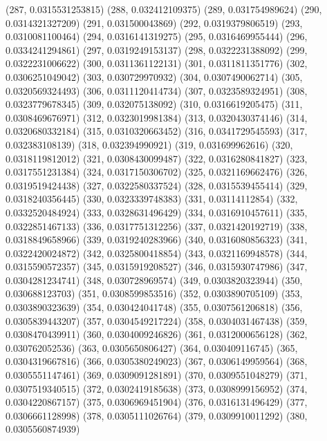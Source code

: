 {					(287, 0.0315531253815)
					(288, 0.032412109375)
					(289, 0.031754989624)
					(290, 0.0314321327209)
					(291, 0.031500043869)
					(292, 0.0319379806519)
					(293, 0.0310081100464)
					(294, 0.0316141319275)
					(295, 0.0316469955444)
					(296, 0.0334241294861)
					(297, 0.0319249153137)
					(298, 0.0322231388092)
					(299, 0.0322231006622)
					(300, 0.0311361122131)
					(301, 0.0311811351776)
					(302, 0.0306251049042)
					(303, 0.030729970932)
					(304, 0.0307490062714)
					(305, 0.0320569324493)
					(306, 0.0311120414734)
					(307, 0.0323589324951)
					(308, 0.0323779678345)
					(309, 0.032075138092)
					(310, 0.0316619205475)
					(311, 0.0308469676971)
					(312, 0.0323019981384)
					(313, 0.0320430374146)
					(314, 0.0320680332184)
					(315, 0.0310320663452)
					(316, 0.0341729545593)
					(317, 0.032383108139)
					(318, 0.032394990921)
					(319, 0.031699962616)
					(320, 0.0318119812012)
					(321, 0.0308430099487)
					(322, 0.0316280841827)
					(323, 0.0317551231384)
					(324, 0.0317150306702)
					(325, 0.0321169662476)
					(326, 0.0319519424438)
					(327, 0.0322580337524)
					(328, 0.0315539455414)
					(329, 0.0318240356445)
					(330, 0.0323339748383)
					(331, 0.03114112854)
					(332, 0.0332520484924)
					(333, 0.0328631496429)
					(334, 0.0316910457611)
					(335, 0.0322851467133)
					(336, 0.0317751312256)
					(337, 0.0321420192719)
					(338, 0.0318849658966)
					(339, 0.0319240283966)
					(340, 0.0316080856323)
					(341, 0.0322420024872)
					(342, 0.0325800418854)
					(343, 0.0321169948578)
					(344, 0.0315590572357)
					(345, 0.0315919208527)
					(346, 0.0315930747986)
					(347, 0.0304281234741)
					(348, 0.030728969574)
					(349, 0.0303820323944)
					(350, 0.030688123703)
					(351, 0.0308599853516)
					(352, 0.0303890705109)
					(353, 0.0303890323639)
					(354, 0.030424041748)
					(355, 0.0307561206818)
					(356, 0.0305839443207)
					(357, 0.0304549217224)
					(358, 0.0304031467438)
					(359, 0.0308470439911)
					(360, 0.0304009246826)
					(361, 0.0312000656128)
					(362, 0.030762052536)
					(363, 0.0305650806427)
					(364, 0.030409116745)
					(365, 0.0304319667816)
					(366, 0.0305380249023)
					(367, 0.0306149959564)
					(368, 0.0305551147461)
					(369, 0.0309091281891)
					(370, 0.0309551048279)
					(371, 0.0307519340515)
					(372, 0.0302419185638)
					(373, 0.0308999156952)
					(374, 0.0304220867157)
					(375, 0.0306969451904)
					(376, 0.0316131496429)
					(377, 0.0306661128998)
					(378, 0.0305111026764)
					(379, 0.0309910011292)
					(380, 0.0305560874939)
}
